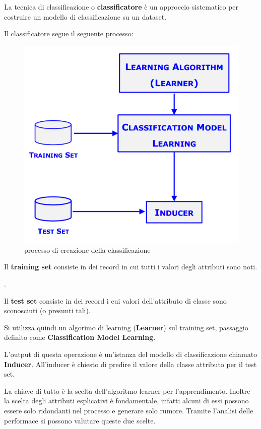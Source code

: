 \begin{defn}
	La tecnica di classificazione o \textbf{classificatore} è un approccio sistematico per costruire un modello di classificazione su un dataset.
\end{defn}
Il classificatore segue il seguente processo:

\begin{figure}[H]
	\centering
	\includegraphics[height=0.6 \linewidth]{classification/pict/class_process.png}
	\caption{processo di creazione della classificazione}
\end{figure}

\begin{defn}
	Il \textbf{training set} consiste in dei record in cui tutti i valori degli attributi sono noti.
\end{defn}.  

\begin{defn}
	Il \textbf{test set} consiste in dei record i cui valori dell'attributo di classe sono sconosciuti (o presunti tali).
\end{defn}

Si utilizza quindi un algorimo di learning (\textbf{Learner}) sul training set, passaggio definito come \textbf{Classification Model Learning}. 

\begin{defn}
	L'output di questa operazione è un'istanza del modello di classificazione chiamato \textbf{Inducer}. All'inducer è chiesto di predire il valore della classe attributo per il test set. 
\end{defn}

La chiave di tutto è la scelta dell'algoritmo learner per l'apprendimento. Inoltre la scelta degli attributi esplicativi è fondamentale, infatti alcuni di essi possono essere solo ridondanti nel processo e generare solo rumore. Tramite l'analisi delle performace si possono valutare queste due scelte. 

